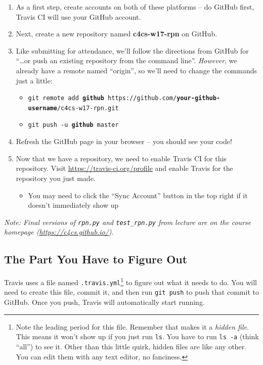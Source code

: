 \documentclass{article}
\begin{document}
\begin{enumerate}
  \item As a first step, create accounts on both of these platforms -- do
    GitHub first, Travis CI will use your GitHub account.
  \item Next, create a new repository named \textbf{c4cs-w17-rpn} on GitHub.
  \item Like submitting for attendance, we'll follow the directions from
    GitHub for ``\dots{}or push an existing repository from the command
    line''. \emph{However}, we already have a remote named ``origin'', so
    we'll need to change the commands just a little:
    \begin{itemize}
      \item \texttt{git remote add \textbf{github} https://github.com/\textbf{your-github-username}/c4cs-w17-rpn.git}
      \item \texttt{git push -u \textbf{github} master}
    \end{itemize}
  \item Refresh the GitHub page in your browser -- you should see your code!
  \item Now that we have a repository, we need to enable Travis CI for this
    repository. Visit \url{https://travis-ci.org/profile} and enable Travis
    for the repository you just made.
    \begin{itemize}
      \item You may need to click the ``Sync Account'' button in the top
        right if it doesn't immediately show up
    \end{itemize}
\end{enumerate}

\emph{Note: Final versions of \texttt{rpn.py} and \texttt{test\_rpn.py} from
  lecture are on the course homepage (\url{https://c4cs.github.io/}).}

\newpage

\subsection{The Part You Have to Figure Out}

Travis uses a file named \texttt{.travis.yml}\footnote{%
  Note the leading period for this file. Remember that makes it a \emph{hidden
    file}. This means it won't show up if you just run \texttt{ls}. You have
  to run \texttt{ls -a} (think ``all'') to see it. Other than this little
  quirk, hidden files are like any other. You can edit them with any text
  editor, no fanciness.
} to figure out what it needs to do. You will need to create this file, commit
it, and then run \texttt{git push} to push that commit to GitHub. Once you
push, Travis will automatically start running.
\end{document}
